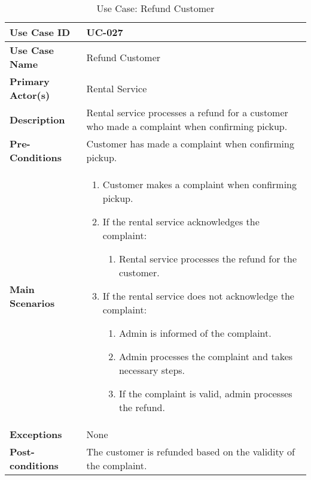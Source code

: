 \begin{table}[ht]
    \centering
    \begin{tabular}{|l|p{}|}
        \hline
        \textbf{Use Case ID} & UC-027 \\
        \hline
        \textbf{Use Case Name} & Refund Customer \\
        \hline
        \textbf{Primary Actor(s)} & Rental Service \\
        \hline
        \textbf{Description} & Rental service processes a refund for a customer who made a complaint when confirming pickup. \\
        \hline
        \textbf{Pre-Conditions} & Customer has made a complaint when confirming pickup. \\
        \hline
        \textbf{Main Scenarios} & 
        \begin{enumerate}[label=\arabic*.,itemsep=0pt]
            \item Customer makes a complaint when confirming pickup.
            \item If the rental service acknowledges the complaint:
                \begin{enumerate}[label=\alph*.,itemsep=0pt]
                    \item Rental service processes the refund for the customer.
                \end{enumerate}
            \item If the rental service does not acknowledge the complaint:
                \begin{enumerate}[label=\alph*.,itemsep=0pt]
                    \item Admin is informed of the complaint.
                    \item Admin processes the complaint and takes necessary steps.
                    \item If the complaint is valid, admin processes the refund.
                \end{enumerate}
        \end{enumerate} \\
        \hline
        \textbf{Exceptions} & None \\
        \hline
        \textbf{Post-conditions} & The customer is refunded based on the validity of the complaint. \\
        \hline
    \end{tabular}
    \label{tab:use-case-refund-customer}
    \caption{Use Case: Refund Customer}
\end{table}

\clearpage